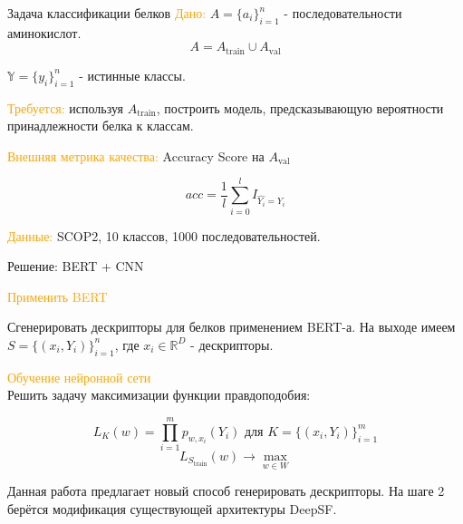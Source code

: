 \documentclass{beamer}
\begin{document}
\begin{frame}{Задача классификации белков}
\textcolor{orange}{Дано:}  $A = \{a_i \}_{i = 1}^n$ - последовательности аминокислот. 
$$A = A_{\text{train}} \cup A_{\text{val}}$$ 

$\mathbb{Y} = \{y_i\}_{i = 1}^n$ - истинные классы.

\bigskip

\textcolor{orange}{Требуется:} используя  $A_{\text{train}}$, построить модель, предсказывающую вероятности принадлежности белка к классам.

\bigskip

\textcolor{orange}{Внешняя метрика качества:} Accuracy Score на $A_{\text{val}}$

$$acc = \frac{1}{l} \sum_{i = 0}^{l} I_{\hat{Y_i} = Y_i}$$

\bigskip

\textcolor{orange}{Данные:} SCOP2, 10 классов, 1000 последовательностей. 

\end{frame}

\begin{frame}{Решение: BERT + CNN}

\textcolor{orange}{Применить BERT}

 Сгенерировать дескрипторы для белков применением BERT-а. На выходе имеем $S = \{ (x_i, Y_i)\}_{i = 1}^n$, где $x_i \in \mathbb{R}^D$ - дескрипторы.


\textcolor{orange}{Обучение нейронной сети} \\Решить задачу максимизации функции правдоподобия:

$$L_{K}(w) = \prod_{i = 1}^{m} p_{w, x_i}(Y_i) \text{    для  } K = \{ (x_i, Y_i)\}_{i = 1}^m$$
$$ L_{S_{\text{train}}}(w) \rightarrow \max\limits_{w \in W}$$

\bigskip

Данная работа предлагает новый способ генерировать дескрипторы.  На шаге 2 берётся модификация существующей архитектуры DeepSF.
\end{frame}


 
\end{document}
